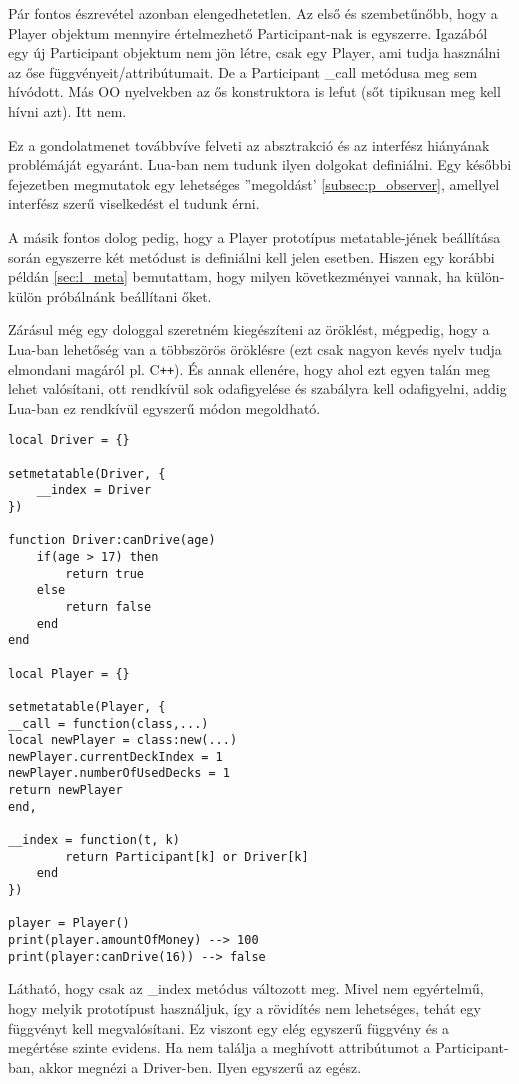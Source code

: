 Pár fontos észrevétel azonban elengedhetetlen. Az első és szembetűnőbb, hogy a Player objektum mennyire értelmezhető Participant-nak is egyszerre. Igazából egy új Participant objektum nem jön létre, csak egy Player, ami tudja használni az őse függvényeit/attribútumait. De a Participant \_call metódusa meg sem hívódott. Más OO nyelvekben az ős konstruktora is lefut (sőt tipikusan meg kell hívni azt). Itt nem. 

\label{comment1}
Ez a gondolatmenet továbbvíve felveti az absztrakció és az interfész hiányának problémáját egyaránt. Lua-ban nem tudunk ilyen dolgokat definiálni. Egy későbbi fejezetben megmutatok egy lehetséges ''megoldást' \ref{subsec:p_observer}, amellyel interfész szerű viselkedést el tudunk érni. 

A másik fontos dolog pedig, hogy a Player prototípus metatable-jének beállítása során egyszerre két metódust is definiálni kell jelen esetben. Hiszen egy korábbi példán \ref{sec:l_meta} bemutattam, hogy milyen következményei vannak, ha külön-külön próbálnánk beállítani őket. 


Zárásul még egy dologgal szeretném kiegészíteni az öröklést, mégpedig, hogy a Lua-ban lehetőség van a többszörös öröklésre (ezt csak nagyon kevés nyelv tudja elmondani magáról pl.  C\verb|++|). És annak ellenére, hogy ahol ezt egyen talán meg lehet valósítani, ott rendkívül sok odafigyelése és szabályra kell odafigyelni, addig Lua-ban ez rendkívül egyszerű módon megoldható.
\scriptsize
\begin{lstlisting}
local Driver = {}

setmetatable(Driver, {
	__index = Driver
})

function Driver:canDrive(age)
	if(age > 17) then 
		return true
	else
		return false
	end
end

local Player = {}

setmetatable(Player, {
__call = function(class,...)
local newPlayer = class:new(...)
newPlayer.currentDeckIndex = 1
newPlayer.numberOfUsedDecks = 1
return newPlayer
end,

__index = function(t, k)
		return Participant[k] or Driver[k]
	end
})

player = Player()
print(player.amountOfMoney) --> 100
print(player:canDrive(16)) --> false
\end{lstlisting}
\normalsize
Látható, hogy csak az \_index metódus változott meg. Mivel nem egyértelmű, hogy melyik prototípust használjuk, így a rövidítés nem lehetséges, tehát egy függvényt kell megvalósítani. Ez viszont egy elég egyszerű függvény és a megértése szinte evidens. Ha nem találja a meghívott attribútumot a Participant-ban, akkor megnézi a Driver-ben. Ilyen egyszerű az egész. 

